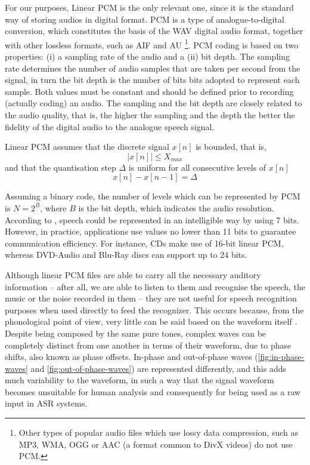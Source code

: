 For our purposes, Linear PCM is the only relevant one, since it is the standard way of storing audios in digital format. \ac{PCM} is a type of analogue-to-digital conversion, which constitutes the basis of the WAV digital audio format, together
with other lossless formats, such as AIF and AU
\footnote{Other types of popular audio files which use lossy data compression, such as MP3, WMA, OGG or AAC (a format common to 
DivX videos) do not use PCM.}. 
PCM coding is based on two properties: (i) a sampling rate of the audio and a (ii) bit depth. The sampling rate determines the
number of audio samples that are taken per second from the signal, in turn the bit depth is the number of bits 
bits adopted to represent each sample. Both values must be constant and should be defined prior to recording (actually coding) an audio. 
The sampling and the bit depth are closely related to the audio quality, that is, the higher the sampling and the depth
the better the fidelity of the digital audio to the analogue speech signal.

Linear PCM assumes that the discrete signal $x[n]$ is bounded, that is,
\begin{equation}
|x[n]| \leq X_{max} 
\end{equation}
and that the quantisation step $\Delta$ is uniform for all consecutive levels of $x[n]$
\begin{equation}
x[n] - x[n-1] = \Delta
\end{equation}

Assuming a binary code, the number of levels which can be represented by PCM is $N=2^B$, where $B$ is the bit depth, which indicates
the audio resolution. According to \citep{Huang2001}, speech could be represented in an intelligible way by using 7 bits. However, in 
practice, applications use values no lower than 11 bits to guarantee communication efficiency. For instance, CDs make use of 16-bit 
linear PCM, whereas DVD-Audio and Blu-Ray discs can support up to 24 bits.

Although linear PCM files are able to carry all the necessary auditory information -- after all, we are able to listen to them and
recognise the speech, the music or the noise recorded in them -- they are not useful for speech recognition purposes when used directly to feed the recognizer. This occurs 
because, from the phonological point of view, very little can be said based on the waveform itself \citep{Shrawankar2010}. Despite being composed by the same pure tones, complex waves can be completely distinct from one another in terms of their waveform, due to phase shifts, also known as phase offsets. In-phase and out-of-phase waves (\autoref{fig:in-phase-waves} and
\autoref{fig:out-of-phase-waves}) are represented differently, and this adds much variability to the waveform, in such a way that
the signal waveform becomes unsuitable for human analysis and consequently for being used as a raw input in \ac{ASR} systems. 

